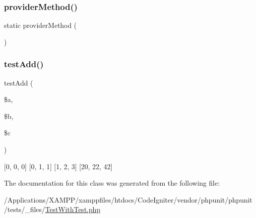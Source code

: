 \subsubsection{\texorpdfstring{provider\+Method()}{providerMethod()}}
{\footnotesize\ttfamily static provider\+Method (\begin{DoxyParamCaption}{ }\end{DoxyParamCaption})\hspace{0.3cm}{\ttfamily [static]}}

\mbox{\label{class_test_with_test_aee936425adb92ab632ef751353789f64}} 
\subsubsection{\texorpdfstring{test\+Add()}{testAdd()}}
{\footnotesize\ttfamily test\+Add (\begin{DoxyParamCaption}\item[{}]{\$a,  }\item[{}]{\$b,  }\item[{}]{\$c }\end{DoxyParamCaption})}

\mbox{[}0, 0, 0\mbox{]} \mbox{[}0, 1, 1\mbox{]} \mbox{[}1, 2, 3\mbox{]} \mbox{[}20, 22, 42\mbox{]} 

The documentation for this class was generated from the following file\+:\begin{DoxyCompactItemize}
\item 
/\+Applications/\+X\+A\+M\+P\+P/xamppfiles/htdocs/\+Code\+Igniter/vendor/phpunit/phpunit/tests/\+\_\+files/\mbox{\hyperlink{_test_with_test_8php}{Test\+With\+Test.\+php}}\end{DoxyCompactItemize}
